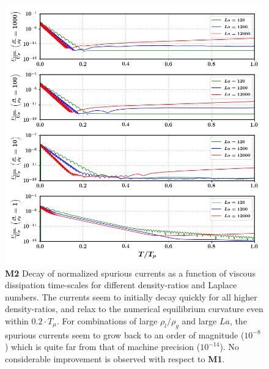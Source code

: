 \begin{figure}[h!]
    \centering
    \includegraphics[]{plots/static_drop/decay_daniel.png}
	\caption{\textbf{M2} Decay of normalized spurious currents as a function of viscous dissipation time-scales for different density-ratios and Laplace numbers. The currents seem to initially decay quickly for all higher density-ratios, and relax to the numerical equilibrium curvature even within $0.2 \cdot T_\mu$. For combinations of large $\rho_l / \rho_g$ and large $La$, the spurious currents seem to grow back to an order of magnitude ($10^{-8}$) which is quite far from that of machine precision ($10^{-14}$). No considerable improvement is observed with respect to \textbf{M1}. }   
    \label{decay_daniel}
\end{figure}

